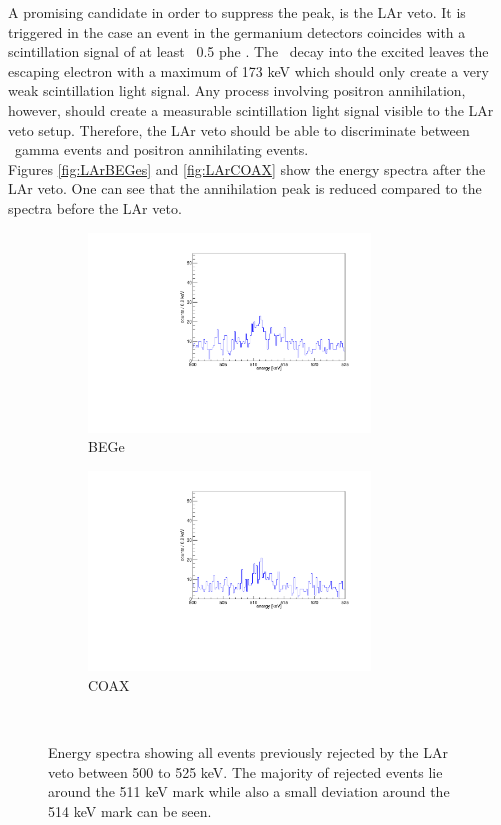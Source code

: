 \documentclass[encoding=utf8,british]{tumphthesis}
\begin{document}
A promising candidate in order to suppress the peak, is the LAr veto.
It is triggered in the case an event in the germanium detectors coincides with a scintillation signal of at least ~0.5 phe \cite{agostini_background_2017}.
The \Kr\ decay into the excited  leaves the escaping electron with a maximum of 173 keV which should only create a very weak scintillation light signal.
Any process involving positron annihilation, however, should create a measurable scintillation light signal visible to the LAr veto setup.
Therefore, the LAr veto should be able to discriminate between \Kr\ gamma events and positron annihilating events.
\\

Figures \ref{fig:LArBEGes} and \ref{fig:LArCOAX} show the energy spectra after the LAr veto.
One can see that the annihilation peak is reduced compared to the spectra before the LAr veto.
\\

\begin{figure}[t!]
	\centering
	\begin{subfigure}{.5\textwidth}
		\includegraphics[width=75mm]{./Bilder/AntiLArBEGe.pdf}
		\caption{BEGe}
		\label{fig:AntiLArBEGes}
	\end{subfigure}\hfill%
	\begin{subfigure}{.5\textwidth}
		\includegraphics[width=75mm]{./Bilder/AntiLArCOAX.pdf}
		\caption{COAX}
		\label{fig:AntiLArCOAX}
	\end{subfigure}
	\\
	\vspace{0.5cm}
	\caption{
	Energy spectra showing all events previously rejected by the LAr veto between 500 to 525 keV.
	The majority of rejected events lie around the 511 keV mark while also a small deviation around the 514 keV mark can be seen.
	}
\end{figure}
\end{document}
